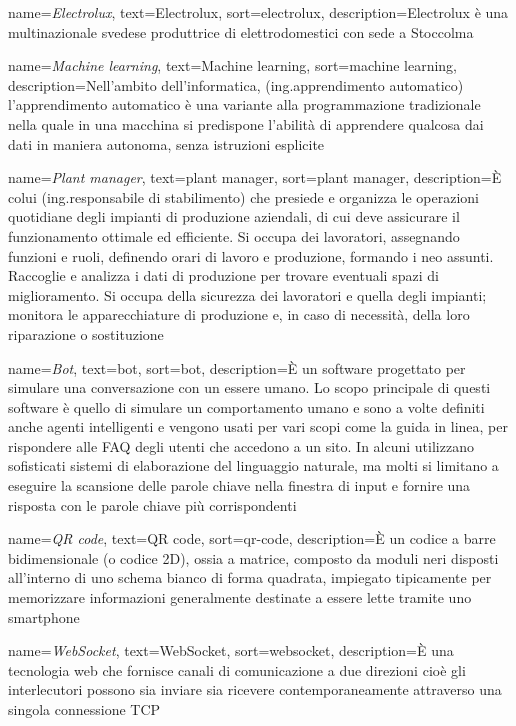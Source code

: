 {
	name={\textit{Electrolux}},
	text=Electrolux,
	sort=electrolux,
	description={Electrolux è una multinazionale svedese produttrice di elettrodomestici con sede a Stoccolma}
}

{
	name={\textit{Machine learning}},
	text=Machine learning,
	sort=machine learning,
	description={Nell'ambito dell'informatica, (ing.apprendimento automatico) l'apprendimento automatico è una variante alla programmazione tradizionale nella quale in una macchina si predispone l'abilità di apprendere qualcosa dai dati in maniera autonoma, senza istruzioni esplicite}
}

{
	name={\textit{Plant manager}},
	text=plant manager,
	sort=plant manager,
	description={È colui (ing.responsabile di stabilimento) che presiede e organizza le operazioni quotidiane degli impianti di produzione aziendali, di cui deve assicurare il funzionamento ottimale ed efficiente. Si occupa dei lavoratori, assegnando funzioni e ruoli, definendo orari di lavoro e produzione, formando i neo assunti. Raccoglie e analizza i dati di produzione per trovare eventuali spazi di miglioramento. Si occupa della sicurezza dei lavoratori e quella degli impianti; monitora le apparecchiature di produzione e, in caso di necessità, della loro riparazione o sostituzione}
}

{
	name={\textit{Bot}},
	text=bot,
	sort=bot,
	description={È un software progettato per simulare una conversazione con un essere umano. Lo scopo principale di questi software è quello di simulare un comportamento umano e sono a volte definiti anche agenti intelligenti e vengono usati per vari scopi come la guida in linea, per rispondere alle FAQ degli utenti che accedono a un sito. In alcuni utilizzano sofisticati sistemi di elaborazione del linguaggio naturale, ma molti si limitano a eseguire la scansione delle parole chiave nella finestra di input e fornire una risposta con le parole chiave più corrispondenti}
}

{
	name={\textit{QR code}},
	text=QR code,
	sort=qr-code,
	description={È un codice a barre bidimensionale (o codice 2D), ossia a matrice, composto da moduli neri disposti all'interno di uno schema bianco di forma quadrata, impiegato tipicamente per memorizzare informazioni generalmente destinate a essere lette tramite uno smartphone}
}

{
	name={\textit{WebSocket}},
	text=WebSocket,
	sort=websocket,
	description={È una tecnologia web che fornisce canali di comunicazione a due direzioni cioè gli interlecutori possono sia inviare sia ricevere contemporaneamente attraverso una singola connessione TCP}
}

